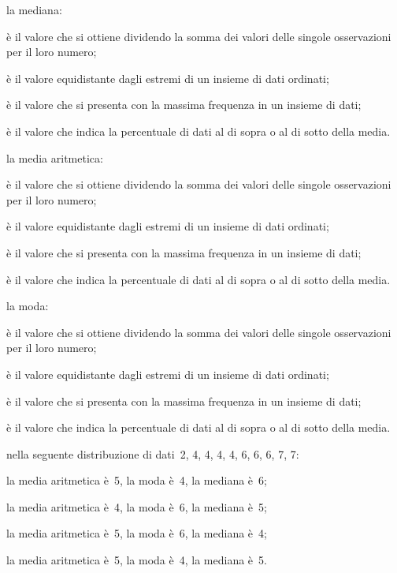 \begin{esercizio}
\begin{enumerate*}
\item la mediana:
 \begin{enumeratea}
\item è il valore che si ottiene dividendo la somma dei valori delle 
singole osservazioni per il loro numero;
\item è il valore equidistante dagli estremi di un insieme di dati ordinati;
\item è il valore che si presenta con la massima frequenza in un insieme di 
dati;
\item è il valore che indica la percentuale di dati al di sopra o al di 
sotto della media.
 \end{enumeratea}
\item la media aritmetica:
 \begin{enumeratea}
 \item è il valore che si ottiene dividendo la somma dei valori delle 
singole osservazioni per il loro numero;
\item è il valore equidistante dagli estremi di un insieme di dati ordinati;
\item è il valore che si presenta con la massima frequenza in un insieme di 
dati;
\item è il valore che indica la percentuale di dati al di sopra o al di 
sotto della media.
 \end{enumeratea}
\item la moda:
 \begin{enumeratea}
\item è il valore che si ottiene dividendo la somma dei valori delle 
singole osservazioni per il loro numero;
\item è il valore equidistante dagli estremi di un insieme di dati ordinati;
\item è il valore che si presenta con la massima frequenza in un insieme di 
dati;
\item è il valore che indica la percentuale di dati al di sopra o al di 
sotto della media.
 \end{enumeratea}
\item nella seguente distribuzione di dati~2, 4, 4, 4, 4, 6, 6, 6, 7, 7:
 \begin{enumeratea}
\item la media aritmetica è~5, la moda è~4, la mediana è~6;
\item la media aritmetica è~4, la moda è~6, la mediana è~5;
\item la media aritmetica è~5, la moda è~6, la mediana è~4;
\item la media aritmetica è~5, la moda è~4, la mediana è~5.

\end{enumeratea}
\end{enumerate*}
\end{esercizio}
